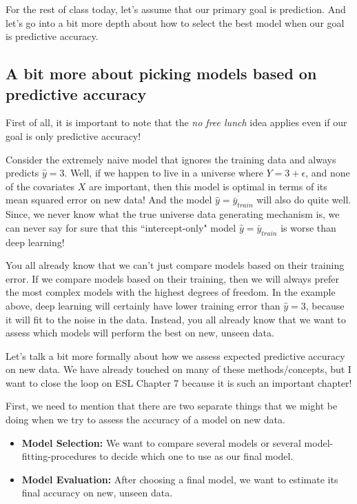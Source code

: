 For the rest of class today, let's assume that our primary goal is prediction. And let's go into a bit more depth about how to select the best model when our goal is predictive accuracy. 


\subsection{A bit more about picking models based on predictive accuracy}

First of all, it is important to note that the \emph{no free lunch} idea applies even if our goal is only predictive accuracy! 

Consider the extremely naive model that ignores the training data and always predicts $\hat{y}=3$. Well, if we happen to live in a universe where $Y = 3 + \epsilon$, and none of the covariates $X$ are important, then this model is optimal in terms of its mean squared error on new data! And the model $\hat{y} = \bar{y}_{train}$ will also do quite well. Since, we never know what the true universe data generating mechanism is, we can never say for sure that this ``intercept-only" model $\hat{y} = \bar{y}_{train}$  is worse than deep learning! 

You all already know that we can't just compare models based on their training error. If we compare models based on their training, then we will always prefer the most complex models with the highest degrees of freedom. In the example above, deep learning will certainly have lower training error than $\hat{y}=3$, because it will fit to the noise in the data. Instead, you all already know that we want to assess which models will perform the best on new, unseen data. 

Let's talk a bit more formally about how we assess expected predictive accuracy on new data. We have already touched on many of these methods/concepts, but I want to close the loop on ESL Chapter 7 because it is such an important chapter!

First, we need to mention that there are two separate things that we might be doing when we try to assess the accuracy of a model on new data. 
\begin{itemize}
\item \textbf{Model Selection:} We want to compare several models or several model-fitting-procedures to decide which one to use as our final model. 
\item \textbf{Model Evaluation:} After choosing a final model, we want to estimate its final accuracy on new, unseen data.
\end{itemize}


